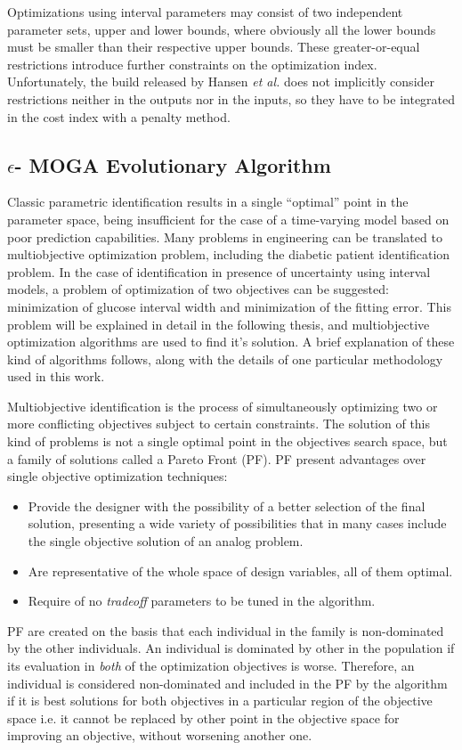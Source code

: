 Optimizations using interval parameters may consist of two independent parameter sets, upper and lower bounds, where obviously all the lower bounds must be smaller than their respective upper bounds. These greater-or-equal restrictions introduce further constraints on the optimization index. Unfortunately, the build released by Hansen \textit{et al.} \cite{hansen2004evaluating} does not implicitly consider restrictions neither in the outputs nor in the inputs, so they have to be integrated in the cost index with a penalty method.

\subsection{$\epsilon$- MOGA Evolutionary Algorithm}
\label{sec:EpsilonMOGAEvolutionaryAlgorithm}

Classic parametric identification results in a single ``optimal'' point in the parameter space, being insufficient for the case of a time-varying model based on poor prediction capabilities. Many problems in engineering can be translated to multiobjective optimization problem, including the diabetic patient identification problem. In the case of identification in presence of uncertainty using interval models, a problem of optimization of two objectives can be suggested: minimization of glucose interval width and minimization of the fitting error. This problem will be explained in detail in the following thesis, and multiobjective optimization algorithms are used to find it's solution. A brief explanation of these kind of algorithms follows, along with the details of one particular methodology used in this work.

Multiobjective identification is the process of simultaneously optimizing two or more conflicting objectives subject to certain constraints. The solution of this kind of problems is not a single optimal point in the objectives search space, but a family of solutions called a Pareto Front (PF). PF present advantages over single objective optimization techniques:
\begin{itemize}
	\item Provide the designer with the possibility of a better selection of the final solution, presenting a wide variety of possibilities that in many cases include the single objective solution of an analog problem.
	\item Are representative of the whole space of design variables, all of them optimal.
	\item Require of no \emph{tradeoff} parameters to be tuned in the algorithm.
\end{itemize}
PF are created on the basis that each individual in the family is non-dominated by the other individuals. An individual is dominated by other in the population if its evaluation in \emph{both} of the optimization objectives is worse. Therefore, an individual is considered non-dominated and included in the PF by the algorithm if it is best solutions for both objectives in a particular region of the objective space i.e. it cannot be replaced by other point in the objective space for improving an objective, without worsening another one. 

